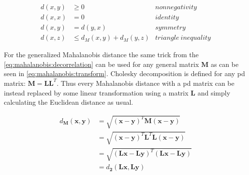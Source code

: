 \documentclass[12pt,a4paper]{report}
\begin{document}
\begin{align}
d(x,y) &\geq 0 & nonnegativity \label{eq:pseudodef-1} \\
d(x,x) &= 0 & identity \label{eq:pseudodef-2} \\
d(x,y) &= d(y,x) & symmetry \label{eq:pseudodef-3} \\
d(x,z) &\leq d_M(x,y) + d_M(y,z) & triangle \ inequality \label{eq:pseudodef-4}
\end{align} 

For the generalized Mahalanobis distance the same trick from the \ref{eq:mahalanobis:decorrelation} can be used for any general matrix $\bm{M}$ as can be seen in \ref{eq:mahalanobis:transform}. Cholesky decomposition is defined for any \ac{pd} matrix: $\bm{M}=\bm{L}\bm{L}^T$. Thus every Mahalanobis distance with a \ac{pd} matrix can be instead replaced by some linear transformation using a matrix $\bm{L}$ and simply calculating the Euclidean distance as usual.

\begin{align}
  d_{\bm{M}}(\textbf{x},\textbf{y}) &= \sqrt{(\textbf{x}-\textbf{y})^{T}\bm{M}(\textbf{x}-\textbf{y})} \nonumber\\
         &= \sqrt{(\textbf{x}-\textbf{y})^{T}\bm{L}^{T}\bm{L}(\textbf{x}-\textbf{y})} \nonumber\\
         &= \sqrt{(\bm{L}\textbf{x}-\bm{L}\textbf{y})^{T}(\bm{L}\textbf{x}-\bm{L}\textbf{y})} \nonumber\\
         &= d_{\bm{2}}(\bm{L}\textbf{x}, \bm{L}\textbf{y}) \label{eq:mahalanobis:transform}
\end{align}








\end{document}
